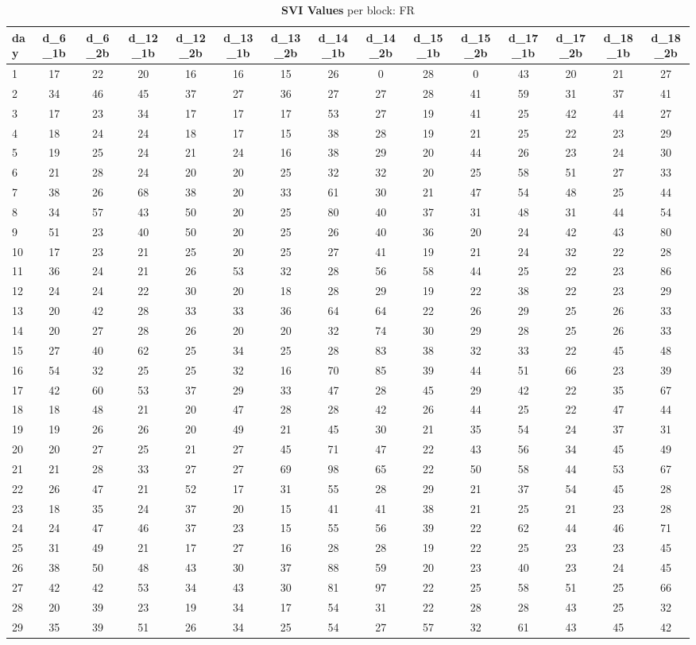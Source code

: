 \documentclass[a4paper,12pt]{article}
\begin{document}
\newpage
\begin{landscape}
\begin{footnotesize}
\begin{center}
\begin{longtable}{lcccccccccccccc}
\caption{\textbf{SVI Values} per block: FR\label{tab_fr_1}}
\hline
day&d\_6\_1b&d\_6\_2b&d\_12\_1b&d\_12\_2b&d\_13\_1b&d\_13\_2b&d\_14\_1b&d\_14\_2b&d\_15\_1b&d\_15\_2b&d\_17\_1b&d\_17\_2b&d\_18\_1b&d\_18\_2b \\ \hline
1&17&22&20&16&16&15&26&0&28&0&43&20&21&27 \\
2&34&46&45&37&27&36&27&27&28&41&59&31&37&41 \\
3&17&23&34&17&17&17&53&27&19&41&25&42&44&27 \\
4&18&24&24&18&17&15&38&28&19&21&25&22&23&29 \\
5&19&25&24&21&24&16&38&29&20&44&26&23&24&30 \\
6&21&28&24&20&20&25&32&32&20&25&58&51&27&33 \\
7&38&26&68&38&20&33&61&30&21&47&54&48&25&44 \\
8&34&57&43&50&20&25&80&40&37&31&48&31&44&54 \\
9&51&23&40&50&20&25&26&40&36&20&24&42&43&80 \\
10&17&23&21&25&20&25&27&41&19&21&24&32&22&28 \\
11&36&24&21&26&53&32&28&56&58&44&25&22&23&86 \\
12&24&24&22&30&20&18&28&29&19&22&38&22&23&29 \\
13&20&42&28&33&33&36&64&64&22&26&29&25&26&33 \\
14&20&27&28&26&20&20&32&74&30&29&28&25&26&33 \\
15&27&40&62&25&34&25&28&83&38&32&33&22&45&48 \\
16&54&32&25&25&32&16&70&85&39&44&51&66&23&39 \\
17&42&60&53&37&29&33&47&28&45&29&42&22&35&67 \\
18&18&48&21&20&47&28&28&42&26&44&25&22&47&44 \\
19&19&26&26&20&49&21&45&30&21&35&54&24&37&31 \\
20&20&27&25&21&27&45&71&47&22&43&56&34&45&49 \\
21&21&28&33&27&27&69&98&65&22&50&58&44&53&67 \\
22&26&47&21&52&17&31&55&28&29&21&37&54&45&28 \\
23&18&35&24&37&20&15&41&41&38&21&25&21&23&28 \\
24&24&47&46&37&23&15&55&56&39&22&62&44&46&71 \\
25&31&49&21&17&27&16&28&28&19&22&25&23&23&45 \\
26&38&50&48&43&30&37&88&59&20&23&40&23&24&45 \\
27&42&42&53&34&43&30&81&97&22&25&58&51&25&66 \\
28&20&39&23&19&34&17&54&31&22&28&28&43&25&32 \\
29&35&39&51&26&34&25&54&27&57&32&61&43&45&42 \\ \hline
\end{longtable}
\end{center}
\end{footnotesize}
\end{landscape}
\end{document}

